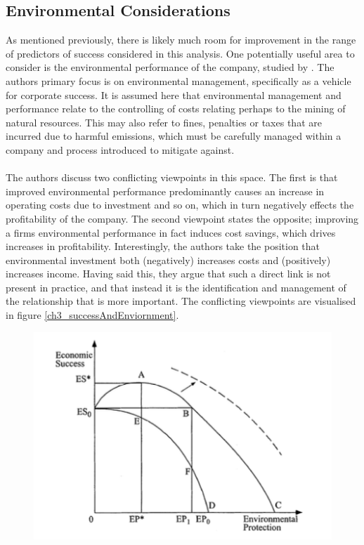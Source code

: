\subsection{Environmental Considerations}\label{EnvironmentalConsiderations}
{As mentioned previously, there is likely much room for improvement in the range of predictors of success considered in this analysis. One potentially useful area to consider is the environmental performance of the company, studied by \cite{schaltegger2002link}. The authors primary focus is on environmental management, specifically as a vehicle for corporate success. It is assumed here that environmental management and performance relate to the controlling of costs relating perhaps to the mining of natural resources. This may also refer to fines, penalties or taxes that are incurred due to harmful emissions, which must be carefully managed within a company and process introduced to mitigate against. \\\\
The authors discuss two conflicting viewpoints in this space. The first is that improved environmental performance predominantly causes an increase in operating costs due to investment and so on, which in turn negatively effects the profitability of the company. The second viewpoint states the opposite; improving a firms environmental performance in fact induces cost savings, which drives increases in profitability. Interestingly, the authors take the position that environmental investment both (negatively) increases costs and (positively) increases income. Having said this, they argue that such a direct link is not present in practice, and that instead it is the identification and management of the relationship that is more important. The conflicting viewpoints are visualised in figure \ref{ch3_successAndEnviornment}. 
\begin{figure}[h] 
\centering
\includegraphics[scale = 0.7]{images/ch3_successAndEnviornment.png}

\end{figure}}
